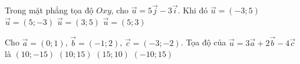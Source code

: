 \begin{ex}%
Trong mặt phẳng tọa độ $Oxy$, cho $\overrightarrow{u}=5\overrightarrow{j}-3\overrightarrow{i}$. Khi đó
	\choice
	{\True $\overrightarrow{u}=(-3;5)$}
	{$\overrightarrow{u}=(5;-3)$}
	{$\overrightarrow{u}=(3;5)$}
	{$\overrightarrow{u}=(5;3)$}
\end{ex}

\begin{ex}%
Cho $\overrightarrow{a}=(0;1)$, $\overrightarrow{b}=(-1;2)$, $\overrightarrow{c}=(-3;-2)$. Tọa độ của $\overrightarrow{u}=3\overrightarrow{a}+2\overrightarrow{b}-4\overrightarrow{c}$ là
	\choice
	{$(10;-15)$}
	{\True $(10;15)$}
	{$(15;10)$}
	{$(-10;15)$}
\end{ex}

